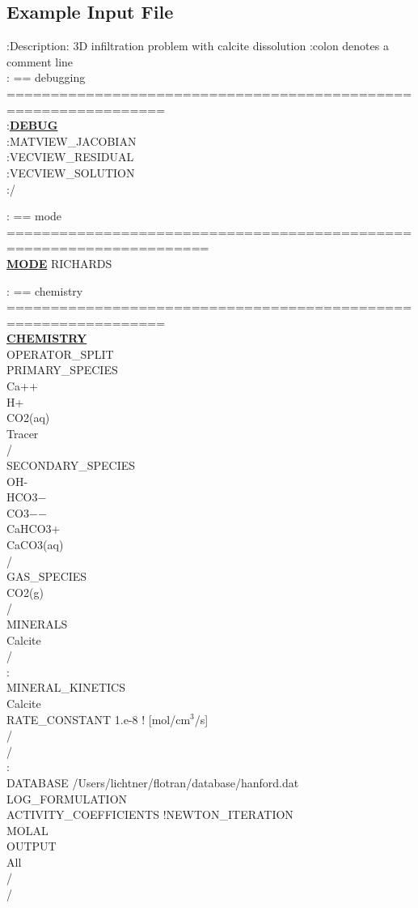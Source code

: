 \documentclass[12pt]{article}
\begin{document}
\clearpage

\subsection{Example Input File}

\hypertarget{target_input_file}{}

\footnotesize
:Description: 3D infiltration problem with calcite dissolution
:colon denotes a comment line\\

\noindent
: == debugging ================================================================\\
:\hyperlink{target_dbg}{\bf DEBUG}\\
:MATVIEW\_JACOBIAN\\
:VECVIEW\_RESIDUAL\\
:VECVIEW\_SOLUTION\\
:/

\noindent
: == mode =====================================================================\\
\hyperlink{target_mode}{\bf MODE} RICHARDS

\noindent
: == chemistry ================================================================\\
\hyperlink{target_chem}{\bf CHEMISTRY}\\
OPERATOR\_SPLIT\\
PRIMARY\_SPECIES\\
Ca++\\
H+\\
CO2(aq)\\
Tracer\\
/\\
SECONDARY\_SPECIES\\
OH-\\
HCO3$-$\\
CO3$-$$-$\\
CaHCO3+\\
CaCO3(aq)\\
/\\
GAS\_SPECIES\\
CO2(g)\\
/\\
MINERALS\\
Calcite\\
/\\
:\\
MINERAL\_KINETICS\\
Calcite\\
RATE\_CONSTANT 1.e-8 ! [mol/cm$^3$/s]\\
/\\
/\\
:\\
DATABASE /Users/lichtner/flotran/database/hanford.dat\\
LOG\_FORMULATION\\
ACTIVITY\_COEFFICIENTS !NEWTON\_ITERATION\\
MOLAL\\
OUTPUT\\
All\\
/\\
/
\end{document}
